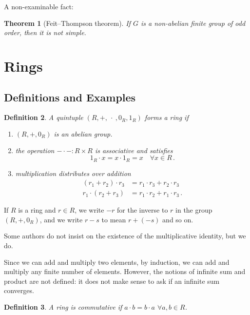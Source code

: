 \documentclass{article}
\theoremstyle{plain}\theoremheaderfont{\normalfont\itshape}\theorembodyfont{\rmfamily}\theoremseparator{.}\newtheorem*{rem}{Remark}\newtheorem*{ex}{Example}\newtheorem*{proof}{Proof}\newtheorem*{altp}{Alternative proof}\newtheorem*{nonex}{Non-Example}
\theoremstyle{plain}\theoremheaderfont{\normalfont\bfseries}\theorembodyfont{\rmfamily}\theoremseparator{.}\newtheorem{thm}{Theorem}[section]\newtheorem{lem}[thm]{Lemma}\newtheorem{prop}[thm]{Proposition}\newtheorem*{cor}{Corollary}\newtheorem{defn}[thm]{Definition}\newtheorem{clm}[thm]{Claim}\newtheorem{clminproof}{Claim}\newtheorem*{notn}{Notation}\newtheorem*{exer}{Exercise}\newtheorem*{lemnn}{Lemma}
\theoremstyle{break}\theoremheaderfont{\normalfont\itshape}\theorembodyfont{\rmfamily}\theoremseparator{.\medskip}\newtheorem*{proofskip}{Proof}\newtheorem*{exs}{Examples}\newtheorem*{rems}{Remarks}\newtheorem*{obs}{Observations}
\theoremstyle{break}\theoremheaderfont{\normalfont\bfseries}\theorembodyfont{\rmfamily}\theoremseparator{.\medskip}\newtheorem{lemskip}[thm]{Lemma}\newtheorem{defnskip}[thm]{Definition}\newtheorem{propskip}[thm]{Proposition}\newtheorem{thmskip}[thm]{Theorem}
\numberwithin{equation}{section}
\begin{document}
    A non-examinable fact:
    \begin{thm}[Feit--Thompson theorem]
        If \(G\) is a non-abelian finite group of odd order, then it is not simple.
    \end{thm}

    \newpage

    \section{Rings}
    \subsection{Definitions and Examples}
    \begin{defn}
        A quintuple \((R,+,\ \cdot \ ,0_R,1_R)\) forms a \textit{ring} if
        \begin{enumerate}[topsep=0pt,label=(\roman*)]
            \item \((R,+,0_R)\) is an abelian group.
            \item the operation \(-\cdot-:R\times R\) is associative and satisfies
            \[1_R\cdot x=x\cdot 1_R=x \quad \forall x\in R\,.\]
            \item multiplication distributes over addition
            \begin{align*}
                (r_1+r_2)\cdot r_3&=r_1\cdot r_3+r_2\cdot r_3\\
                r_1\cdot(r_2+r_3)&=r_1\cdot r_2+r_1\cdot r_3\,.
            \end{align*}
        \end{enumerate}
    \end{defn}

    If \(R\) is a ring and \(r\in R\), we write \(-r\) for the inverse to \(r\) in the group \((R,+,0_R)\), and we write \(r-s\) to mean \(r+(-s)\) and so on.
    
    Some authors do not insist on the existence of the multiplicative identity, but we do.
    
    Since we can add and multiply two elements, by induction, we can add and multiply any finite number of elements. However, the notions of infinite sum and product are not defined: it does not make sense to ask if an infinite sum converges.

    \begin{defn}
        A ring is \textit{commutative} if \(a\cdot b=b\cdot a\) \(\forall a,b\in R\).
    \end{defn}
\end{document}
